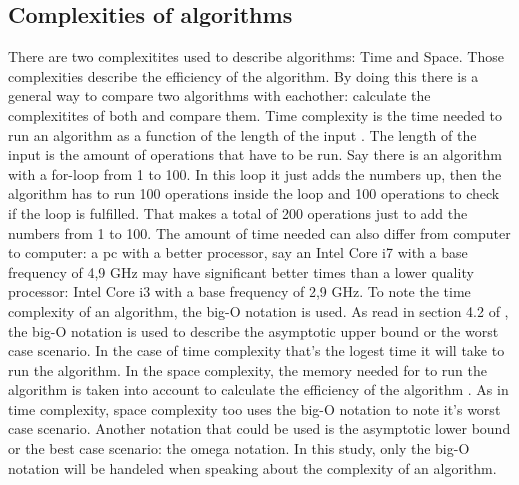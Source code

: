 \subsection{Complexities of algorithms}
\label{subsec:Complexities}
There are two complexitites used to describe algorithms: Time and Space. Those complexities describe the efficiency of the algorithm. By doing this there is a general way to compare two algorithms with eachother: calculate the complexitites of both and compare them.
Time complexity is the time needed to run an algorithm as a function of the length of the input \autocite{Timecomp}. The length of the input is the amount of operations that have to be run. Say there is an algorithm with a for-loop from 1 to 100.
In this loop it just adds the numbers up, then the algorithm has to run 100 operations inside the loop and 100 operations to check if the loop is fulfilled. That makes a total of 200 operations just to add the numbers from 1 to 100.
The amount of time needed can also differ from computer to computer: a pc with a better processor, say an Intel Core i7 with a base frequency of 4,9 GHz may have significant better times than a lower quality processor: Intel Core i3 with a base frequency of 2,9 GHz.
To note the time complexity of an algorithm, the big-O notation is used. As read in section 4.2 of \textcite{Hidary_2019}, the big-O notation is used to describe the asymptotic upper bound or the worst case scenario. In the case of time complexity that's the logest time it will take to run the algorithm.
In the space complexity, the memory needed for to run the algorithm is taken into account to calculate the efficiency of the algorithm \autocite{Abhishek2021Ruimte}. As in time complexity, space complexity too uses the big-O notation to note it's worst case scenario. Another notation that could be used is the asymptotic lower bound or the best case scenario: the omega notation.
In this study, only the big-O notation will be handeled when speaking about the complexity of an algorithm.

